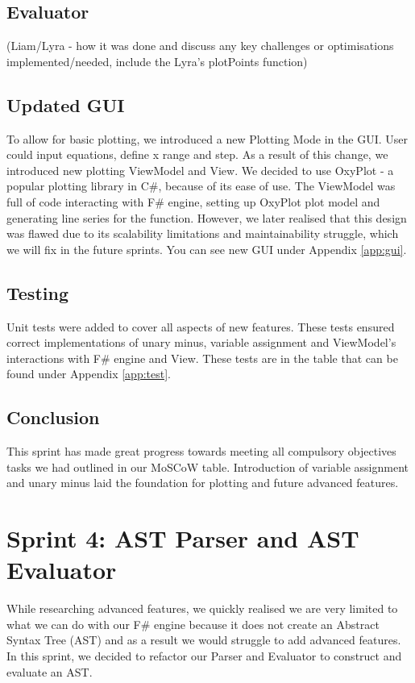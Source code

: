 \documentclass[a4paper, oneside, 11pt]{report}
\begin{document}
\subsection{Evaluator}
(Liam/Lyra - how it was done and discuss any key challenges or optimisations implemented/needed, include the Lyra's plotPoints function)

\subsection{Updated GUI}
To allow for basic plotting, we introduced a new Plotting Mode in the GUI. User could input equations, define x range and step. As a result of this change, we introduced new plotting ViewModel and View. We decided to use OxyPlot\cite{Oxyplot} - a popular plotting library in C\#, because of its ease of use. The ViewModel was full of code interacting with F\# engine, setting up OxyPlot plot model and generating line series for the function. However, we later realised that this design was flawed due to its scalability limitations and maintainability struggle, which we will fix in the future sprints. You can see new GUI under Appendix \ref{app:gui}.

\subsection{Testing}
Unit tests were added to cover all aspects of new features. These tests ensured correct implementations of unary minus, variable assignment and ViewModel’s interactions with F\# engine and View. These tests are in the table that can be found under Appendix \ref{app:test}.


\subsection{Conclusion}
This sprint has made great progress towards meeting all compulsory objectives tasks we had outlined in our MoSCoW table. Introduction of variable assignment and unary minus laid the foundation for plotting and future advanced features.



\section{Sprint 4: AST Parser and AST Evaluator}
While researching advanced features, we quickly realised we are very limited to what we can do with our F\# engine because it does not create an Abstract Syntax Tree (AST) and as a result we would struggle to add advanced features. In this sprint, we decided to refactor our Parser and Evaluator to construct and evaluate an AST.
\end{document}
